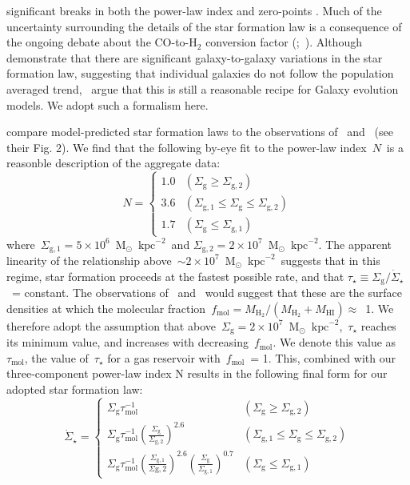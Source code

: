\documentclass[fleqn, usenatbib]{mnras}
\newcommand{\msun}{\ensuremath{\text{M}_\odot}}
\newcommand{\persqkpc}{\ensuremath{\text{kpc}^{-2}}}
\begin{document}
significant breaks in both the power-law index and zero-points 
\citep{Kennicutt2020}. Much of the uncertainty surrounding the details of the 
star formation law is a consequence of the ongoing debate about the CO-to-H$_2$ 
conversion factor (\citealp{Kennicutt2012};~\citealp*{Liu2015}). Although 
\citet{Ellison2020a} demonstrate that there are significant galaxy-to-galaxy 
variations in the star formation law, suggesting that individual galaxies do 
not follow the population averaged trend,~\citet{delosReyes2019} argue that 
this is still a reasonable recipe for Galaxy evolution models. We adopt such a 
formalism here. 
\par 
\citet{Krumholz2018} compare model-predicted star formation laws to the 
observations of~\citet{Bigiel2010} and~\citet{Leroy2013} (see their Fig. 2). We 
find that the following by-eye fit to the power-law index~$N$~is a reasonble 
description of the aggregate data: 
\begin{equation} 
N = \begin{cases} 
1.0 & (\Sigma_\text{g} \geq \Sigma_{\text{g},2}) \\ 
3.6 & (\Sigma_{\text{g},1} \leq \Sigma_\text{g} \leq \Sigma_{\text{g},2}) \\ 
1.7 & (\Sigma_\text{g} \leq \Sigma_{\text{g},1}) 
\end{cases} 
\label{eq:sf_law_indeces} 
\end{equation} 
where~$\Sigma_{\text{g},1} = 5\times10^6$~\msun~\persqkpc~and 
$\Sigma_{\text{g},2} = 2\times10^7$~\msun~\persqkpc. The apparent linearity of 
the relationship above~$\sim2\times10^7$~\msun~\persqkpc~suggests that in this 
regime, star formation proceeds at the fastest possible rate, and that 
$\tau_\star \equiv \Sigma_\text{g}/\dot{\Sigma}_\star$~= constant. The 
observations of~\citet{Leroy2013} and~\citet{Kennicutt2020} would suggest that 
these are the 
surface densities at which the molecular fraction~$f_\text{mol} = M_{\text{H}_2} 
/ (M_{\text{H}_2} + M_\text{HI}) \approx$~1. We therefore adopt the assumption 
that above~$\Sigma_\text{g} = 2\times10^7$~\msun~\persqkpc,~$\tau_\star$ 
reaches its minimum value, and increases with decreasing~$f_\text{mol}$. We 
denote this value as~$\tau_\text{mol}$, the value of~$\tau_\star$ for a gas 
reservoir with~$f_\text{mol}$~= 1. This, combined with our three-component 
power-law index N results in the following final form for our adopted star 
formation law: 
\begin{equation} 
\dot{\Sigma}_\star = \begin{cases} 
\Sigma_\text{g} \tau_\text{mol}^{-1} & 
(\Sigma_\text{g} \geq \Sigma_{\text{g},2}) 
\\ 
\Sigma_\text{g} \tau_\text{mol}^{-1} \left(\frac{
	\Sigma_\text{g}
}{
	\Sigma_{\text{g},2} 
}\right)^{2.6} & 
(\Sigma_{\text{g},1} \leq \Sigma_\text{g} \leq \Sigma_{\text{g},2}) 
\\ 
\Sigma_\text{g} \tau_\text{mol}^{-1} \left(\frac{
	\Sigma_{\text{g},1} 
}{
	\Sigma{\text{g},2} 
}\right)^{2.6}\left(\frac{
	\Sigma_\text{g}
}{
	\Sigma_{\text{g},1} 
}\right)^{0.7} & 
(\Sigma_\text{g} \leq \Sigma_{\text{g},1}) 
\end{cases} 
\label{eq:sf_law} 
\end{equation} 
\end{document}
